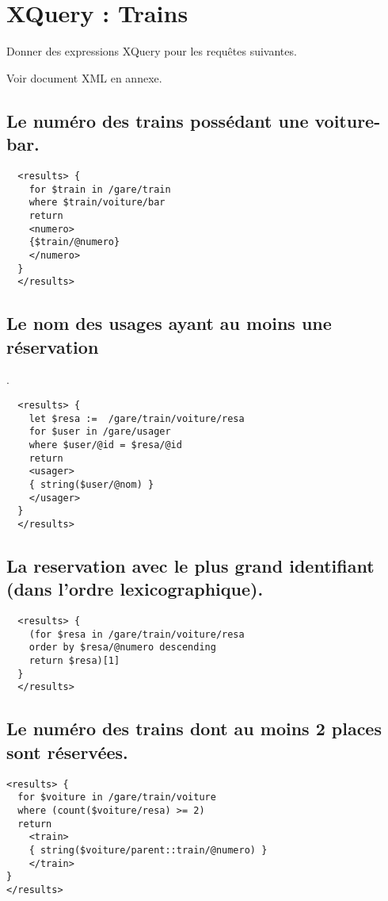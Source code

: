 \chapter{XQuery : Trains}
Donner des expressions XQuery pour les requêtes suivantes.

Voir document XML en annexe.

\section{Le numéro des trains possédant une voiture-bar.}
\begin{verbatim}
  <results> {
    for $train in /gare/train
    where $train/voiture/bar
    return
    <numero>
    {$train/@numero}
    </numero>
  }
  </results>
\end{verbatim}

\section{Le nom des usages ayant au moins une réservation}.
\begin{verbatim}
  <results> {
    let $resa :=  /gare/train/voiture/resa
    for $user in /gare/usager
    where $user/@id = $resa/@id
    return
    <usager>
    { string($user/@nom) }
    </usager>
  }
  </results>
\end{verbatim}

\section{La reservation avec le plus grand identifiant (dans l’ordre lexicographique).}
\begin{verbatim}
  <results> {
    (for $resa in /gare/train/voiture/resa
    order by $resa/@numero descending
    return $resa)[1]
  }
  </results>
\end{verbatim}

\section{Le numéro des trains dont au moins 2 places sont réservées.}
\begin{verbatim}
<results> {
  for $voiture in /gare/train/voiture
  where (count($voiture/resa) >= 2)
  return
    <train>
    { string($voiture/parent::train/@numero) }
    </train>
}
</results>
\end{verbatim}

